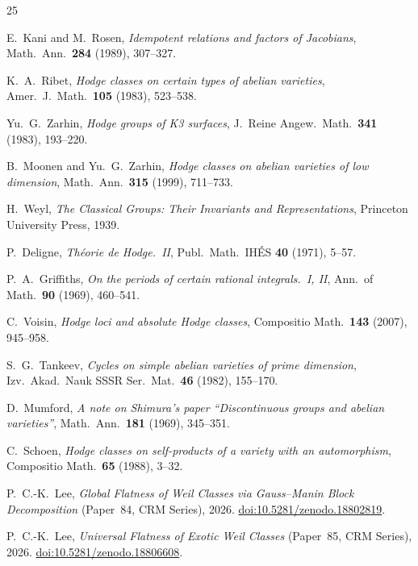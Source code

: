 \documentclass[11pt]{article}
\theoremstyle{plain}
\theoremstyle{definition}
\theoremstyle{remark}
\begin{document}
\begin{thebibliography}{25}

E.~Kani and M.~Rosen,
\emph{Idempotent relations and factors of Jacobians},
Math.\ Ann.\ \textbf{284} (1989), 307--327.

K.~A.~Ribet,
\emph{Hodge classes on certain types of abelian varieties},
Amer.\ J.\ Math.\ \textbf{105} (1983), 523--538.

Yu.~G.~Zarhin,
\emph{Hodge groups of K3 surfaces},
J.~Reine Angew.\ Math.\ \textbf{341} (1983), 193--220.

B.~Moonen and Yu.~G.~Zarhin,
\emph{Hodge classes on abelian varieties of low dimension},
Math.\ Ann.\ \textbf{315} (1999), 711--733.

H.~Weyl,
\emph{The Classical Groups: Their Invariants and Representations},
Princeton University Press, 1939.

P.~Deligne,
\emph{Th\'eorie de Hodge.\ II},
Publ.\ Math.\ IH\'ES \textbf{40} (1971), 5--57.

P.~A.~Griffiths,
\emph{On the periods of certain rational integrals.\ I, II},
Ann.\ of Math.\ \textbf{90} (1969), 460--541.

C.~Voisin,
\emph{Hodge loci and absolute Hodge classes},
Compositio Math.\ \textbf{143} (2007), 945--958.

S.~G.~Tankeev,
\emph{Cycles on simple abelian varieties of prime dimension},
Izv.\ Akad.\ Nauk SSSR Ser.\ Mat.\ \textbf{46} (1982), 155--170.

D.~Mumford,
\emph{A note on Shimura's paper ``Discontinuous groups and
abelian varieties''},
Math.\ Ann.\ \textbf{181} (1969), 345--351.

C.~Schoen,
\emph{Hodge classes on self-products of a variety with an
automorphism},
Compositio Math.\ \textbf{65} (1988), 3--32.

P.~C.-K.~Lee,
\emph{Global Flatness of Weil Classes via Gauss--Manin Block
Decomposition} (Paper~84, CRM Series),
2026.
\href{https://doi.org/10.5281/zenodo.18802819}{doi:10.5281/zenodo.18802819}.

P.~C.-K.~Lee,
\emph{Universal Flatness of Exotic Weil Classes} (Paper~85, CRM Series),
2026.
\href{https://doi.org/10.5281/zenodo.18806608}{doi:10.5281/zenodo.18806608}.


\end{thebibliography}
\end{document}

